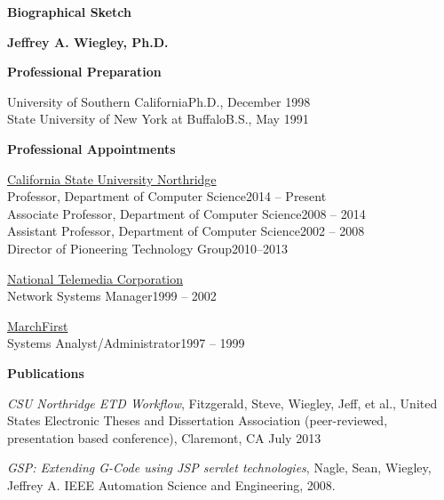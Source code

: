 \documentclass[12pt]{report}
\begin{document}
\selectfont

\renewcommand{\familydefault}{\sfdefault}

\setlength{\parskip}{12pt}
\setlength{\parindent}{0pt}



\pagestyle{empty}

\begin{center}
\textbf{Biographical Sketch}

\textbf{Jeffrey A. Wiegley, Ph.D.}
\end{center}

\textbf{Professional Preparation}

University of Southern California\hfill Ph.D., December 1998\\
State University of New York at Buffalo\hfill B.S., May 1991

\textbf{Professional Appointments}

\underline{California State University Northridge}\\
Professor, Department of Computer Science\hfill 2014 -- Present\\
Associate Professor, Department of Computer Science\hfill 2008 -- 2014\\
Assistant Professor, Department of Computer Science\hfill 2002 -- 2008\\
Director of Pioneering Technology Group\hfill 2010--2013

\underline{National Telemedia Corporation}\\
Network Systems Manager\hfill 1999 -- 2002

\underline{MarchFirst}\\
Systems Analyst/Administrator\hfill 1997 -- 1999

\textbf{Publications}

\emph{CSU Northridge ETD Workflow}, Fitzgerald,
Steve, Wiegley, Jeff, et al., United States Electronic Theses
and Dissertation Association (peer-reviewed, presentation based conference), Claremont, CA July 2013

\emph{GSP: Extending G-Code using JSP servlet technologies},
	Nagle, Sean, Wiegley, Jeffrey A. IEEE Automation Science and Engineering, 2008.
\end{document}
